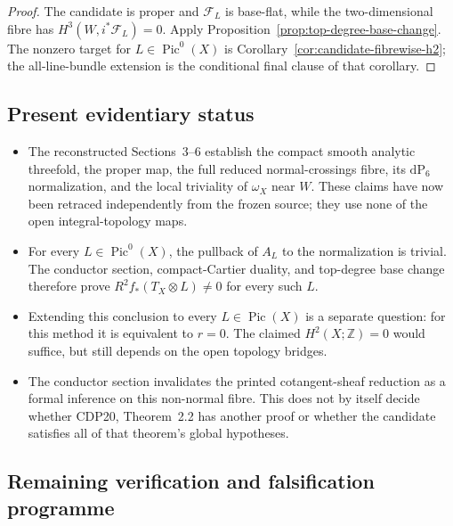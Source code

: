 \begin{proof}
The candidate is proper and $\mathcal F_L$ is base-flat, while the
two-dimensional fibre has $H^3(W,i^*\mathcal F_L)=0$.  Apply
Proposition~\ref{prop:top-degree-base-change}.  The nonzero target for
$L\in\operatorname{Pic}^0(X)$ is
Corollary~\ref{cor:candidate-fibrewise-h2}; the all-line-bundle extension is
the conditional final clause of that corollary.
\end{proof}

\subsection{Present evidentiary status}

\begin{itemize}
\item The reconstructed Sections~3--6 establish the compact smooth analytic
threefold, the proper map, the full reduced normal-crossings fibre, its
$\mathrm{dP}_6$ normalization, and the local triviality of $\omega_X$ near
$W$.  These claims have now been retraced independently from the frozen
source; they use none of the open integral-topology maps.
\item For every $L\in\operatorname{Pic}^0(X)$, the pullback of $A_L$ to the
normalization is trivial.  The conductor section, compact-Cartier duality,
and top-degree base change therefore prove
$R^2f_*(T_X\otimes L)\ne0$ for every such $L$.
\item Extending this conclusion to every $L\in\operatorname{Pic}(X)$ is a
separate question: for this method it is equivalent to $r=0$.  The claimed
$H^2(X;\mathbb Z)=0$ would suffice, but still depends on the open topology
bridges.
\item The conductor section invalidates the printed cotangent-sheaf
reduction as a formal inference on this non-normal fibre.  This does not by
itself decide whether CDP20, Theorem~2.2 has another proof or whether the
candidate satisfies all of that theorem's global hypotheses.
\end{itemize}

\subsection{Remaining verification and falsification programme}


